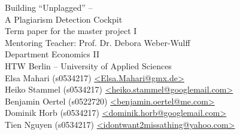 \begin{titlepage}
\vspace*{2cm}

\begin{center}
\Huge
Building \enquote{Unplagged} --\\ A Plagiarism Detection Cockpit\\
\vspace{1cm}
\large
Term paper for the master project I \\ Mentoring Teacher: Prof. Dr. Debora Weber-Wulff\\
\vfill
\normalsize
Department Economics II\\
HTW Berlin -- University of Applied Sciences\\

\vspace{4mm}
Elsa Mahari (s0534217) \href{mailto:elsa.mahari@gmx.de}{\textless Elsa.Mahari@gmx.de\textgreater}\\
Heiko Stammel (s0534217) \href{mailto:heiko.stammel@googlemail.com}{\textless heiko.stammel@googlemail.com\textgreater}\\
Benjamin Oertel (s0522720) \href{mailto:benjamin.oertel@me.com}{\textless benjamin.oertel@me.com\textgreater}\\
Dominik Horb (s0534217) \href{mailto:dominik.horb@googlemail.com}{\textless dominik.horb@googlemail.com\textgreater}\\
Tien Nguyen (s0534217) \href{mailto:idontwant2missathing@yahoo.com}{\textless idontwant2missathing@yahoo.com\textgreater}\\


\end{center}
\end{titlepage}